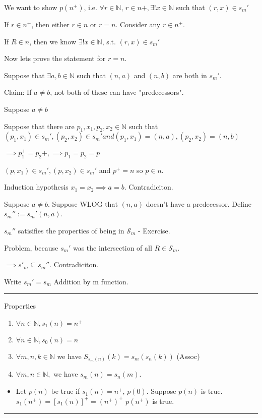 \documentclass[twoside]{article}
\newcommand{\N}{\mathbb{N}}
\newenvironment{proof}{{\bf Proof:}}{\hfill\rule{2mm}{2mm}}
\begin{document}
\begin{proof}
\begin{proof}
        We want to show $p(n^+)$, i.e. $\forall r \in \N$, $r \in n+, \exists! x \in \N$ such that $(r,x) \in s_m'$

        If $r \in n^+$, then either $r \in n$ or $r = n$. Consider any $r \in n^+$.

        If $R \in n$, then we know $\exists! x \in \N$, s.t. $(r,x) \in s_m'$

        Now lets prove the statement for $r = n$. 

        Suppose that $\exists a,b \in \N$ such that $(n,a)$ and $(n,b)$ are both in $s_m'$.

        Claim: If $a \neq b$, not both of these can have "predecessors". 

        Suppose $a \neq b$

        Suppose that there are $p_1,x_1,p_2,x_2 \in \N$ such that $(p_1,x_1) \in s_m', (p_2,x_2) \in s_m' and (p_1,x_1) = (n,a), (p_2,x_2) = (n,b)$

        $\implies p_1^{+} = p_2{+}, \implies p_1 = p_2 = p$

        $(p,x_1) \in s_m', (p,x_2) \in s_m'$ and $p^+ = n$ so $p \in n$. 

        Induction hypothesis $x_1 = x_2 \implies a = b$. Contradiciton. 

        Suppose $a \neq b$. Suppose WLOG that $(n,a)$ doesn't have a predecessor. Define $s_m'' := s_m'(n,a)$.

        $s_m''$ satisifies the properties of being in $\mathcal{S}_m$ - Exercise. 

        Problem, because $s_m' $ was the intersection of all $R \in \mathcal{S}_m$.

        $\implies s'_m \subseteq s_m''$. Contradiciton. 

        Write $s_m' = s_m$ Addition by m function. 
    \end{proof}

    Properties
    
    \begin{enumerate}
        \item $\forall n \in \N, s_1(n) = n^+$
        \item $\forall n\in \N, s_0(n) = n$
        \item $\forall m,n,k \in \N$ we have $S_{s_m(n)}(k) = s_m(s_n(k))$ (Assoc)
        \item $\forall m,n \in \N, $ we have $s_m(n) = s_n(m)$.

    \end{enumerate}

    \begin{itemize}
        \item Let $p(n)$ be true if $s_1(n) = n^+$, $p(0)$. Suppose $p(n)$ is true. $s_1(n^+) = [s_1(n)]^+ = (n^+)^+$
        $p(n^+)$ is true. 

        
    \end{itemize}


\end{proof}
\end{document}
